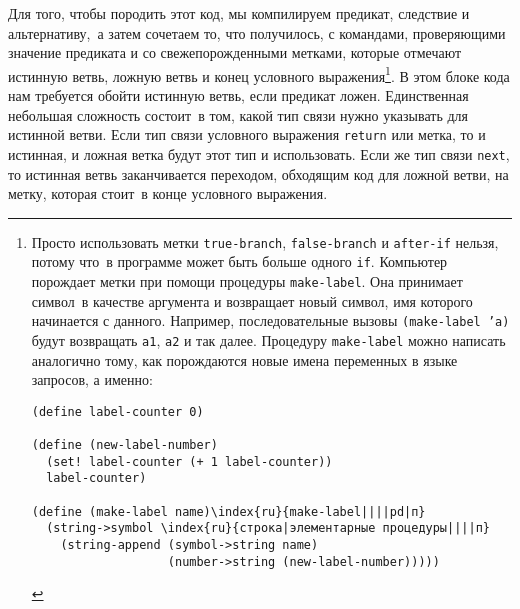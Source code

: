 Для того, чтобы породить этот код, мы компилируем
предикат, следствие и альтернативу,~а затем сочетаем то, что
получилось, с командами, проверяющими значение предиката и со
свежепорожденными метками, которые отмечают истинную ветвь, ложную ветвь и
конец условного выражения\footnote{Просто использовать метки {\tt true-branch},
{\tt false-branch} и {\tt after-if} нельзя, потому
что~в программе может быть больше одного {\tt if}.  Компьютер
порождает метки при помощи процедуры {\tt make-label}.  Она
принимает символ~в качестве аргумента и возвращает новый символ, имя
которого начинается с данного.  Например, последовательные вызовы
{\tt (make-label 'a)} будут возвращать {\tt a1},
{\tt a2} и так далее.  Процедуру {\tt make-label} можно
написать аналогично тому, как порождаются новые имена переменных
в языке запросов, а именно:

\begin{Verbatim}
(define label-counter 0)

(define (new-label-number)
  (set! label-counter (+ 1 label-counter))
  label-counter)

(define (make-label name)\index{ru}{make-label||||pd|п}
  (string->symbol \index{ru}{строка|элементарные процедуры||||п} 
    (string-append (symbol->string name)
                   (number->string (new-label-number)))))
\end{Verbatim}
}. %
В этом блоке кода нам требуется обойти истинную ветвь, если предикат
ложен.  Единственная небольшая сложность состоит~в том, какой тип
связи нужно указывать для истинной ветви.  Если тип связи условного
выражения {\tt return} или метка, то и истинная, и ложная ветка
будут этот тип и использовать.  Если же тип связи {\tt next},
то истинная ветвь заканчивается переходом, обходящим код для ложной
ветви, на метку, которая стоит~в конце условного выражения.

